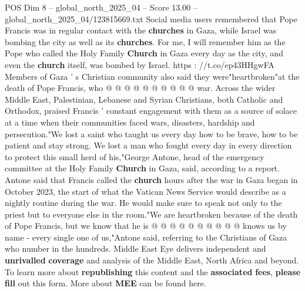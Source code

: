 \begin{textsample}{POS Dim 8 – global\_north\_2025\_04 – Score 13.00 – global\_north\_2025\_04/123815669.txt}
Social media users remembered that Pope Francis was in regular contact with the \textbf{churches} in Gaza, while Israel was bombing the city as well as its \textbf{churches}.
For me, I will remember him as the Pope who called the Holy Family \textbf{Church} in Gaza every day as the city, and even the \textbf{church} itself, was bombed by Israel. https : //t.co/ep43HHgwFA Members of Gaza ' s Christian community also said they were"heartbroken"at the death of Pope Francis, who @ @ @ @ @ @ @ @ @ @ war.
Across the wider Middle East, Palestinian, Lebanese and Syrian Christians, both Catholic and Orthodox, praised Francis ' constant engagement with them as a source of solace at a time when their communities faced wars, disasters, hardship and persecution."We lost a saint who taught us every day how to be brave, how to be patient and stay strong.
We lost a man who fought every day in every direction to protect this small herd of his,"George Antone, head of the emergency committee at the Holy Family \textbf{Church} in Gaza, said, according to a report.
Antone said that Francis called the \textbf{church} hours after the war in Gaza began in October 2023, the start of what the Vatican News Service would describe as a nightly routine during the war.
He would make sure to speak not only to the priest but to everyone else in the room."We are heartbroken because of the death of Pope Francis, but we know that he is @ @ @ @ @ @ @ @ @ @ knows us by name - every single one of us,"Antone said, referring to the Christians of Gaza who number in the hundreds.
Middle East Eye delivers independent and \textbf{unrivalled} \textbf{coverage} and analysis of the Middle East, North Africa and beyond.
To learn more about \textbf{republishing} this content and the \textbf{associated} \textbf{fees}, \textbf{please} \textbf{fill} out this form.
More about \textbf{MEE} can be found here.

\end{textsample}
